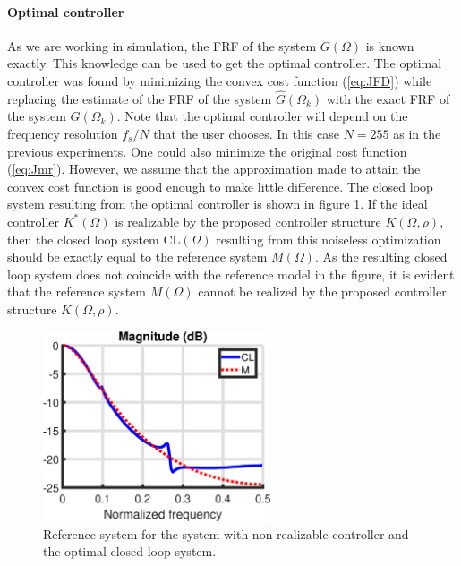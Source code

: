 \paragraph{Optimal controller}
As we are working in simulation, the FRF of the system $G(\Omega)$ is known exactly. This knowledge can be used to get the optimal controller. The optimal controller was found by minimizing the convex cost function (\ref{eq:JFD}) while replacing the estimate of the FRF of the system $\hat{G}(\Omega_k)$ with the exact FRF of the system $G(\Omega_k)$. Note that the optimal controller will depend on the frequency resolution $f_s/N$ that the user chooses. In this case $N = 255$ as in the previous experiments. One could also minimize the original cost function (\ref{eq:Jmr}). However, we assume that the approximation made to attain the convex cost function is good enough to make little difference. The closed loop system resulting from the optimal controller is shown in figure \ref{fig:non_realizable_optimal}. If the ideal controller $K^*(\Omega)$ is realizable by the proposed controller structure $K(\Omega,\rho)$, then the closed loop system $\mathrm{CL}(\Omega)$ resulting from this noiseless optimization should be exactly equal to the reference system $M(\Omega)$. As the resulting closed loop system does not coincide with the reference model in the figure, it is evident that the reference system $M(\Omega)$ cannot be realized by the proposed controller structure $K(\Omega,\rho)$.

\begin{figure}[H]
\centering
\includegraphics[width = 0.6\textwidth]{figures/undermodeled_optimal}
\caption{Reference system for the system with non realizable controller and the optimal closed loop system.}
\label{fig:non_realizable_optimal}
\end{figure}

\newpage

